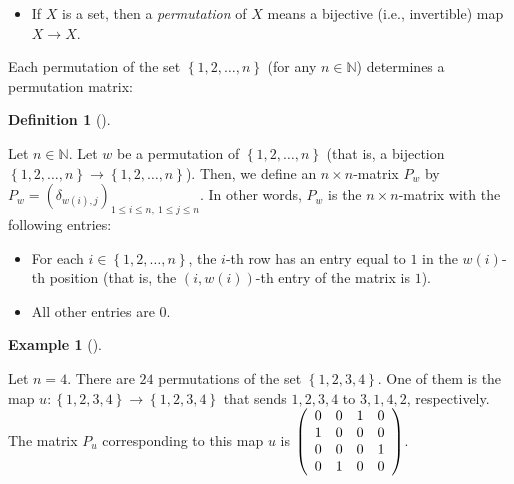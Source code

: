 \documentclass[numbers=enddot,12pt,final,onecolumn,notitlepage]{scrartcl}%
\theoremstyle{definition}
\newtheorem{defi}[theo]{Definition}
\newenvironment{definition}[1][]
{\begin{defi}[#1]\begin{leftbar}}
{\end{leftbar}\end{defi}}
\newtheorem{exam}[theo]{Example}
\newenvironment{example}[1][]
{\begin{exam}[#1]\begin{leftbar}}
{\end{leftbar}\end{exam}}
\begin{document}
\begin{itemize}
For example:

\begin{itemize}
\item The map $\mathbb{Z}\rightarrow\mathbb{Z},\ x\mapsto x+1$ is invertible,
and its inverse is $\mathbb{Z}\rightarrow\mathbb{Z},\ x\mapsto x-1$.

\item The map $\mathbb{Q}\setminus\left\{  1\right\}  \rightarrow
\mathbb{Q}\setminus\left\{  0\right\}  ,\ x\mapsto\dfrac{1}{1-x}$ is
invertible, and its inverse is the map $\mathbb{Q}\setminus\left\{  0\right\}
\rightarrow\mathbb{Q}\setminus\left\{  1\right\}  ,\ x\mapsto1-\dfrac{1}{x}$.
\end{itemize}

A map $f:X\rightarrow Y$ is invertible if and only if it is bijective.

\item If $X$ is a set, then a \textit{permutation} of $X$ means a bijective
(i.e., invertible) map $X\rightarrow X$.
\end{itemize}

Each permutation of the set $\left\{  1,2,\ldots,n\right\}  $ (for any
$n\in\mathbb{N}$) determines a permutation matrix:

\begin{definition}
\label{def.permat.permat-from-perm}Let $n\in\mathbb{N}$. Let $w$ be a
permutation of $\left\{  1,2,\ldots,n\right\}  $ (that is, a bijection
$\left\{  1,2,\ldots,n\right\}  \rightarrow\left\{  1,2,\ldots,n\right\}  $).
Then, we define an $n\times n$-matrix $P_{w}$ by $P_{w}=\left(  \delta
_{w\left(  i\right)  ,j}\right)  _{1\leq i\leq n,\ 1\leq j\leq n}$. In other
words, $P_{w}$ is the $n\times n$-matrix with the following entries:

\begin{itemize}
\item For each $i\in\left\{  1,2,\ldots,n\right\}  $, the $i$-th row has an
entry equal to $1$ in the $w\left(  i\right)  $-th position (that is, the
$\left(  i,w\left(  i\right)  \right)  $-th entry of the matrix is $1$).

\item All other entries are $0$.
\end{itemize}
\end{definition}

\begin{example}
Let $n=4$. There are $24$ permutations of the set $\left\{  1,2,3,4\right\}
$. One of them is the map $u:\left\{  1,2,3,4\right\}  \rightarrow\left\{
1,2,3,4\right\}  $ that sends $1,2,3,4$ to $3,1,4,2$, respectively. The matrix
$P_{u}$ corresponding to this map $u$ is $\left(
\begin{array}
[c]{cccc}%
0 & 0 & 1 & 0\\
1 & 0 & 0 & 0\\
0 & 0 & 0 & 1\\
0 & 1 & 0 & 0
\end{array}
\right)  $.
\end{example}
\end{document}
